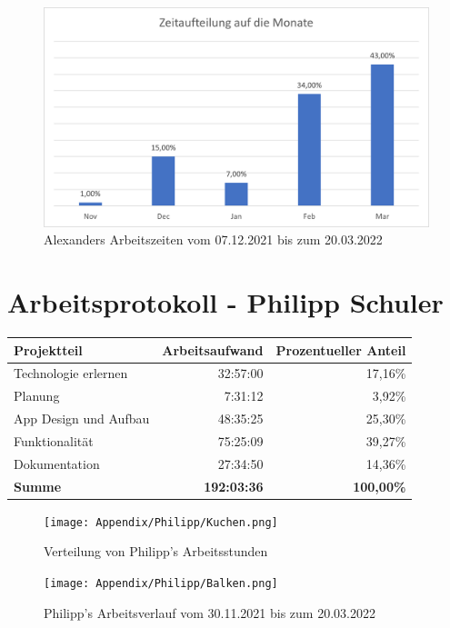 \begin{figure}[H]
    \begin{center}
        \includegraphics[width=1\textwidth]{images/Zeiten/Zeitaufteilung-auf-Monate-Bertoni.png}
        \caption{Alexanders Arbeitszeiten vom 07.12.2021 bis zum 20.03.2022}
    \end{center}
\end{figure}

\section*{Arbeitsprotokoll - Philipp Schuler}

\begin{table}[H]
\begin{tabular}{lrr}
\hline
\textbf{Projektteil}  & \textbf{Arbeitsaufwand} & \textbf{Prozentueller Anteil} \\ \hline
Technologie erlernen  & 32:57:00                   & 17,16\%                    \\
Planung               &  7:31:12                   &  3,92\%                    \\
App Design und Aufbau & 48:35:25                   & 25,30\%                    \\
Funktionalität        & 75:25:09                   & 39,27\%                    \\
Dokumentation         & 27:34:50                   & 14,36\%                    \\ \hline
\textbf{Summe}        & \textbf{192:03:36}         & \textbf{100,00\%}             \\ \hline
\end{tabular}
\end{table}

\begin{figure}[H]
    \begin{center}
        \texttt{[image: Appendix/Philipp/Kuchen.png]}
        \caption{Verteilung von Philipp's Arbeitsstunden}
    \end{center}
\end{figure}

\begin{figure}[H]
    \begin{center}
        \texttt{[image: Appendix/Philipp/Balken.png]}
        \caption{Philipp's Arbeitsverlauf vom 30.11.2021 bis zum 20.03.2022}
    \end{center}
\end{figure}
